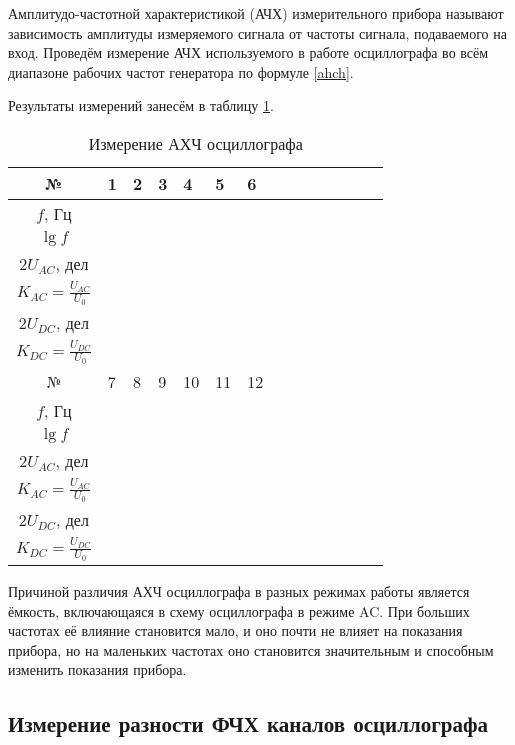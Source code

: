 \documentclass[a4paper,12pt]{article} %
\begin{document}
	Амплитудо-частотной характеристикой (АЧХ) измерительного прибора называют зависимость амплитуды измеряемого
	сигнала от частоты сигнала, подаваемого на вход. Проведём измерение АЧХ используемого в работе осциллографа во всём диапазоне
	рабочих частот генератора по формуле \eqref{ahch}.
	
	Результаты измерений занесём в таблицу \ref{tab:ahch}.
	
	\begin{table}[H]
		\centering
		\begin{tabular}{|c|p{1.2cm}|p{1.2cm}|p{1.2cm}|p{1.2cm}|p{1.2cm}|p{1.2cm}| c|c|c|c|c|c|c|} 
			\hline
			№ &  1  & 2  &  3  &  4  & 5 & 6 \\ \hline
			$ f $, Гц &   &  &  &  & &  \\ \hline
			$ \lg f $ &  &  &  &  & &  \\ \hline
			$ 2U_{AC} $, дел & &  &  &  & &  \\ \hline
			$ K_{AC} = \frac{U_{AC}}{U_0} $& &  &  &  & &  \\ \hline
			$ 2U_{DC} $, дел & &  &  &  & &  \\ \hline
			$ K_{DC} = \frac{U_{DC}}{U_0} $ & &  &  &  & &  \\ \hline \hline
			№ & 7 & 8 & 9 & 10 & 11 & 12 \\ \hline
			$ f $, Гц & &  &  &  & &  \\ \hline
			$ \lg f $ & &  &  &  & &  \\ \hline
			$ 2U_{AC} $, дел & &  &  &  & &  \\ \hline
			$ K_{AC} = \frac{U_{AC}}{U_0} $ & &  &  &  & &  \\ \hline
			$ 2U_{DC} $, дел & &  &  &  & &  \\ \hline
			$ K_{DC} = \frac{U_{DC}}{U_0} $ & &  &  &  & &  \\ \hline
		\end{tabular}
		\caption{Измерение АХЧ осциллографа}
		\label{tab:ahch}
	\end{table}
	
	Причиной различия АХЧ осциллографа в разных режимах работы является ёмкость, включающаяся в схему осциллографа в режиме AC. При больших частотах её влияние становится мало, и оно почти не влияет на показания прибора, но на маленьких частотах оно становится значительным и способным изменить показания прибора.
	
	\subsection{Измерение разности ФЧХ каналов осциллографа}
	
\end{document}
